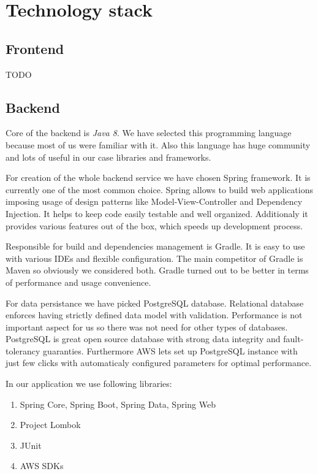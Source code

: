 \documentclass[licencjacka,en]{thesisclass}
\begin{document}
    \section{Technology stack}

    \subsection{Frontend}

    TODO

    \subsection{Backend}

    Core of the backend is \textit{Java 8}. We have selected this programming language because most of us were familiar with it. Also this language has huge community and lots of useful in our case libraries and frameworks.

    For creation of the whole backend service we have chosen Spring framework. It is currently one of the most common choice. Spring allows to build web applications imposing usage of design patterns like Model-View-Controller and Dependency Injection. It helps to keep code easily testable and well organized. Additionaly it provides various features out of the box, which speeds up development process.

    Responsible for build and dependencies management is Gradle. It is easy to use with various IDEs and flexible configuration. The main competitor of Gradle is Maven so obviously we considered both. Gradle turned out to be better in terms of performance and usage convenience.

    For data persistance we have picked PostgreSQL database. Relational database enforces having strictly defined data model with validation. Performance is not important aspect for us so there was not need for other types of databases. PostgreSQL is great open source database with strong data integrity and fault-tolerancy guaranties. Furthermore AWS lets set up PostgreSQL instance with just few clicks with automaticaly configured parameters for optimal performance.

    In our application we use following libraries:
    \begin{enumerate}
        \item Spring Core, Spring Boot, Spring Data, Spring Web
        \item Project Lombok
        \item JUnit
        \item AWS SDKs
    \end{enumerate}
\end{document}

